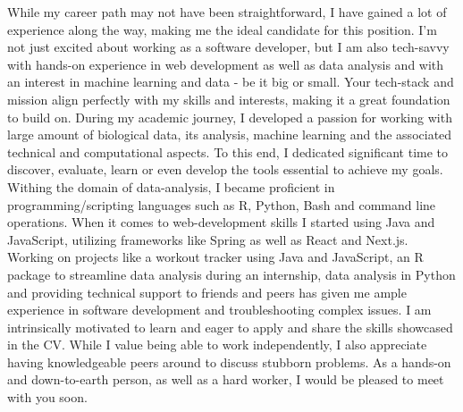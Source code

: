 \documentclass[11pt, a4paper]{awesome-cv}
\begin{document}
\begin{cvletter}
While my career path may not have been straightforward, I have gained a lot of experience along the way, making me the ideal candidate for this position.
I'm not just excited about working as a software developer, but I am also tech-savvy with hands-on experience in web development as well as data analysis and with an interest in machine learning and data - be it big or small. 
Your tech-stack and mission align perfectly with my skills and interests, making it a great foundation to build on.
During my academic journey, I developed a passion for working with large amount of biological data, its analysis, machine learning and the associated technical and computational aspects.
To this end, I dedicated significant time to discover, evaluate, learn or even develop the tools essential to achieve my goals.
Withing the domain of data-analysis, I became proficient in programming/scripting languages such as R, Python, Bash and command line operations.
When it comes to web-development skills I started using Java and JavaScript, utilizing frameworks like Spring as well as React and Next.js.
Working on projects like a workout tracker using Java and JavaScript, an R package to streamline data analysis during an internship, data analysis in Python and providing technical support to friends and peers has given me ample experience in software development and troubleshooting complex issues.
I am intrinsically motivated to learn and eager to apply and share the skills showcased in the CV. 
While I value being able to work independently, I also appreciate having knowledgeable peers around to discuss stubborn problems. 
As a hands-on and down-to-earth person, as well as a hard worker, I would be pleased to meet with you soon.
\end{cvletter}
\makeletterclosing
\end{document}
